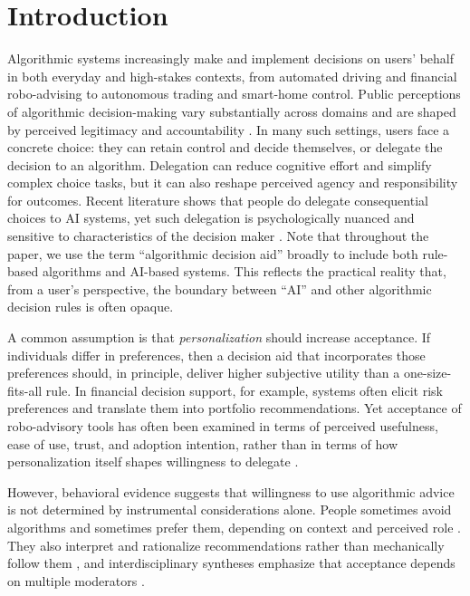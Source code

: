 \documentclass[a4paper, 12pt, fleqn]{article}
\theoremstyle{definition}
\begin{document}
\section{Introduction}\label{sec:intro}
Algorithmic systems increasingly make and implement decisions on users’ behalf in both everyday and high-stakes contexts, from automated driving and financial robo-advising to autonomous trading and smart-home control. Public perceptions of algorithmic decision-making vary substantially across domains and are shaped by perceived legitimacy and accountability \citep{Aysolmaz2023}. In many such settings, users face a concrete choice: they can retain control and decide themselves, or delegate the decision to an algorithm. Delegation can reduce cognitive effort and simplify complex choice tasks, but it can also reshape perceived agency and responsibility for outcomes. Recent literature shows that people do delegate consequential choices to AI systems, yet such delegation is psychologically nuanced and sensitive to characteristics of the decision maker \citep{Candrian2022}. Note that throughout the paper, we use the term ``algorithmic decision aid'' broadly to include both rule-based algorithms and AI-based systems. This reflects the practical reality that, from a user's perspective, the boundary between ``AI'' and other algorithmic decision rules is often opaque.

A common assumption is that \emph{personalization} should increase acceptance. If individuals differ in preferences, then a decision aid that incorporates those preferences should, in principle, deliver higher subjective utility than a one-size-fits-all rule. In financial decision support, for example, systems often elicit risk preferences and translate them into portfolio recommendations. Yet acceptance of robo-advisory tools has often been examined in terms of perceived usefulness, ease of use, trust, and adoption intention, rather than in terms of how personalization itself shapes willingness to delegate \citep{Figa-Talamanca2022,Mahmud2025}.

However, behavioral evidence suggests that willingness to use algorithmic advice is not determined by instrumental considerations alone. People sometimes avoid algorithms and sometimes prefer them, depending on context and perceived role \citep{Dietvorst2018,Logg2019}. They also interpret and rationalize recommendations rather than mechanically follow them \citep{Yeomans2019}, and interdisciplinary syntheses emphasize that acceptance depends on multiple moderators \citep[including perceived control;][]{Mahmud2022,Chugunova2022}. 
\end{document}
